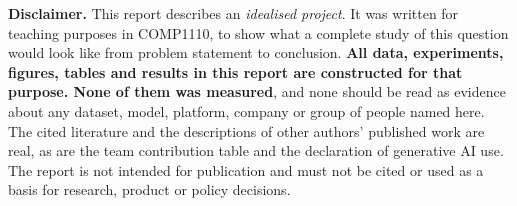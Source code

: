 \begin{disclaimerbox}
\textbf{Disclaimer.} This report describes an \emph{idealised project}. It was written for teaching purposes in COMP1110, to show what a complete study of this question would look like from problem statement to conclusion. \textbf{All data, experiments, figures, tables and results in this report are constructed for that purpose. None of them was measured}, and none should be read as evidence about any dataset, model, platform, company or group of people named here. The cited literature and the descriptions of other authors' published work are real, as are the team contribution table and the declaration of generative AI use. The report is not intended for publication and must not be cited or used as a basis for research, product or policy decisions.
\end{disclaimerbox}
